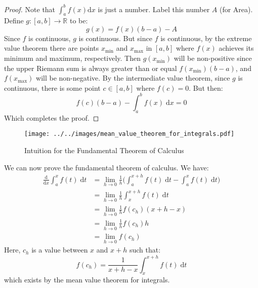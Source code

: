 \documentclass{article}
\theoremstyle{normal}
\theoremstyle{plain}
\begin{document}
    \begin{proof}
        Note that $\int_{a}^{b}f(x)\textrm{d}x$ is just a number. Label this
        number $A$ (for Area). Define $g:[a,b]\rightarrow\mathbb{R}$ to be:
        \begin{equation}
            g(x)=f(x)(b-a)-A
        \end{equation}
        Since $f$ is continuous, $g$ is continuous. But since $f$ is continuous,
        by the extreme value theorem there are points $x_{\textrm{min}}$ and
        $x_{\textrm{max}}$ in $[a,b]$ where $f(x)$ achieves its minimum and
        maximum, respectively. Then $g(x_{\textrm{min}})$ will be
        non-positive since the upper Riemann sum is always greater than or
        equal $f(x_{\textrm{min}})(b-a)$, and $f(x_{\textrm{max}})$ will be
        non-negative. By the intermediate value theorem, since $g$ is
        continuous, there is some point $c\in[a,b]$ where $f(c)=0$. But then:
        \begin{equation}
            f(c)(b-a)-\int_{a}^{b}f(x)\;\textrm{d}x=0
        \end{equation}
        Which completes the proof.
    \end{proof}
    \begin{figure}[H]
        \centering
        \texttt{[image: ../../images/mean\_value\_theorem\_for\_integrals.pdf]}
        \caption{Intuition for the Fundamental Theorem of Calculus}
    \end{figure}
    We can now prove the fundamental theorem of calculus. We have:
    \begin{align}
        \frac{\textrm{d}}{\textrm{d}x}\int_{a}^{x}f(t)\;\textrm{d}t
            &=\lim_{h\rightarrow{0}}\frac{1}{h}\Big(
                \int_{a}^{x+h}f(t)\;\textrm{d}t-
                \int_{a}^{x}f(t)\;\textrm{d}t\Big)\\
            &=\lim_{h\rightarrow{0}}\frac{1}{h}
                \int_{x}^{x+h}f(t)\;\textrm{d}t\\
            &=\lim_{h\rightarrow{0}}\frac{1}{h}f(c_{h})(x+h-x)\\
            &=\lim_{h\rightarrow{0}}\frac{1}{h}f(c_{h})h\\
            &=\lim_{h\rightarrow{0}}f(c_{h})
    \end{align}
    Here, $c_{h}$ is a value between $x$ and $x+h$ such that:
    \begin{equation}
        f(c_{h})=\frac{1}{x+h-x}\int_{x}^{x+h}f(t)\;\textrm{d}t
    \end{equation}
    which exists by the mean value theorem for integrals.
\end{document}
